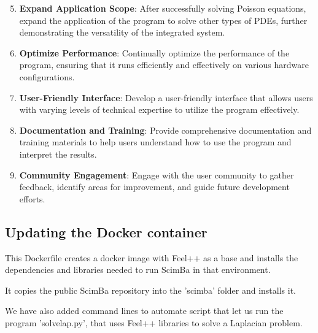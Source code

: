 \documentclass[12pt]{article}
\begin{document}
\begin{enumerate}
    \setcounter{enumi}{4}
    \item \textbf{Expand Application Scope}: After successfully solving Poisson equations, expand the application of the program to solve other types of PDEs, further demonstrating the versatility of the integrated system.
    
    \item \textbf{Optimize Performance}: Continually optimize the performance of the program, ensuring that it runs efficiently and effectively on various hardware configurations.
    
    \item \textbf{User-Friendly Interface}: Develop a user-friendly interface that allows users with varying levels of technical expertise to utilize the program effectively.
    
    \item \textbf{Documentation and Training}: Provide comprehensive documentation and training materials to help users understand how to use the program and interpret the results.
    
    \item \textbf{Community Engagement}: Engage with the user community to gather feedback, identify areas for improvement, and guide future development efforts.
\end{enumerate}



\newpage
\subsection{Updating the Docker container}

This Dockerfile creates a docker image with Feel++ as a base and installs the dependencies and libraries needed to run ScimBa in that environment.

It copies the public ScimBa repository into the 'scimba' folder and installs it.

We have also added command lines to automate script that let us run the program 'solvelap.py', that uses Feel++ libraries to solve a Laplacian problem.

\\
\end{document}
